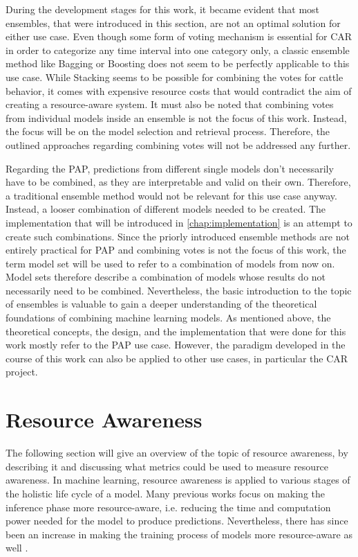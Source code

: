 During the development stages for this work, it became evident that most ensembles, that were introduced in this section, are not an optimal solution for either use case. Even though some form of voting mechanism is essential for CAR in order to categorize any time interval into one category only, a classic ensemble method like Bagging or Boosting does not seem to be perfectly applicable to this use case. While Stacking seems to be possible for combining the votes for cattle behavior, it comes with expensive resource costs that would contradict the aim of creating a resource-aware system. It must also be noted that combining votes from individual models inside an ensemble is not the focus of this work. Instead, the focus will be on the model selection and retrieval process. Therefore, the outlined approaches regarding combining votes will not be addressed any further. 

Regarding the PAP, predictions from different single models don’t necessarily have to be combined, as they are interpretable and valid on their own. Therefore, a traditional ensemble method would not be relevant for this use case anyway. Instead, a looser combination of different models needed to be created. The implementation that will be introduced in \autoref{chap:implementation} is an attempt to create such combinations. Since the priorly introduced ensemble methods are not entirely practical for PAP and combining votes is not the focus of this work, the term model set will be used to refer to a combination of models from now on. Model sets therefore describe a combination of models whose results do not necessarily need to be combined. Nevertheless, the basic introduction to the topic of ensembles is valuable to gain a deeper understanding of the theoretical foundations of combining machine learning models. As mentioned above, the theoretical concepts, the design, and the implementation that were done for this work mostly refer to the PAP use case. However, the paradigm developed in the course of this work can also be applied to other use cases, in particular the CAR project. 


\section{Resource Awareness} \label{sec:ra}

The following section will give an overview of the topic of resource awareness, by describing it and discussing what metrics could be used to measure resource awareness. In machine learning, resource awareness is applied to various stages of the holistic life cycle of a model. Many previous works \cite{amir2018,tann2016,yu2018} focus on making the inference phase more resource-aware, i.e. reducing the time and computation power needed for the model to produce predictions. Nevertheless, there has since been an increase in making the training process of models more resource-aware as well \cite{rapp2022}.


